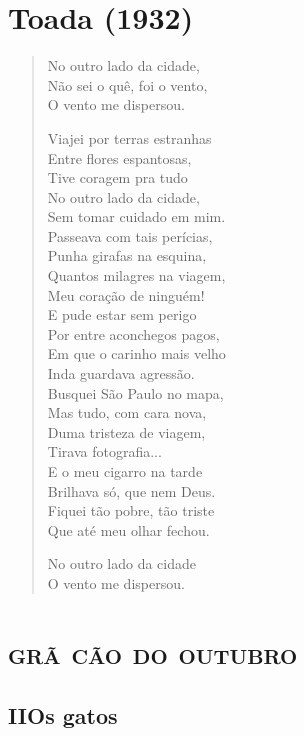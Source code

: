 \chapter[Toada]{Toada (1932)}

\begin{verse}
No outro lado da cidade,\\
Não sei o quê, foi o vento,\\
O vento me dispersou.

Viajei por terras estranhas\\
Entre flores espantosas,\\
Tive coragem pra tudo\\
No outro lado da cidade,\\
Sem tomar cuidado em mim.\\
Passeava com tais perícias,\\
Punha girafas na esquina,\\
Quantos milagres na viagem,\\
Meu coração de ninguém!\\
E pude estar sem perigo\\
Por entre aconchegos pagos,\\
Em que o carinho mais velho\\
Inda guardava agressão.\\
Busquei São Paulo no mapa,\\
Mas tudo, com cara nova,\\
Duma tristeza de viagem,\\
Tirava fotografia...\\
E o meu cigarro na tarde\\
Brilhava só, que nem Deus.\\
Fiquei tão pobre, tão triste\\
Que até meu olhar fechou.

No outro lado da cidade\\
O vento me dispersou.
\end{verse}

\chapter[\textsc{grã cão do outubro}\\II -- Os gatos]{\textsc{grã cão do outubro}}

\section{II\break Os gatos}


